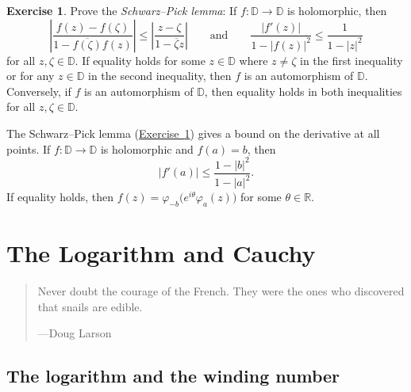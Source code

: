 \documentclass[12pt,openany]{book}
\newcommand{\widebar}[1]{\overline{#1}}
\newcommand{\sabs}[1]{\lvert {#1} \rvert}
\newcommand{\abs}[1]{\left\lvert {#1} \right\rvert}
\newcommand{\R}{{\mathbb{R}}}
\newcommand{\D}{{\mathbb{D}}}
\newcommand{\myindex}[1]{#1\index{#1}}
\theoremstyle{plain}
\theoremstyle{remark}
\theoremstyle{definition}
\newenvironment{exbox}{%
    \def\FrameCommand{\vrule width 1pt \relax\hspace{10pt}}%
    \MakeFramed{\advance\hsize-\width\FrameRestore}%
}{%
    \endMakeFramed
}
\newenvironment{myepigraph}{%
    \begin{quote}%
    \begingroup\itshape
}{%
    \endgroup%
    \end{quote}
}
\theoremstyle{exercise}
\newtheorem{exercise}{Exercise}[section]
\theoremstyle{example}
\newcommand{\exerciseref}[1]{\hyperref[#1]{Exercise~\ref*{#1}}}
\begin{document}
\begin{exbox}
\begin{exercise} \label{exercise:schwarzpick}
Prove the \emph{\myindex{Schwarz--Pick lemma}}:
If $f \colon \D \to \D$ is holomorphic, then
\begin{equation*}
\abs{
\frac{f(z)-f(\zeta)}{1-\overline{f(\zeta)}f(z)}
}
\leq
\abs{
\frac{z-\zeta}{1-\widebar{\zeta}z} 
}
\qquad
\text{and}
\qquad
\frac{\abs{f'(z)}}{1-\abs{f(z)}^2} \leq
\frac{1}{1-\abs{z}^2}
\end{equation*}
for all $z,\zeta \in \D$.
If equality holds 
for some $z \in \D$ where $z \neq \zeta$
in the first inequality
or for any $z \in \D$ in the second inequality,
then $f$ is an automorphism of $\D$.
Conversely, if $f$ is an automorphism of $\D$,
then equality holds in both inequalities for
all $z,\zeta \in \D$.
\end{exercise}
\end{exbox}

\pagebreak[0]
The Schwarz--Pick lemma (\exerciseref{exercise:schwarzpick}) gives a bound on the derivative
at all points.  If
$f \colon \D \to \D$ is holomorphic and $f(a) = b$,
then
\begin{equation*}
\sabs{f'(a)} \leq
\frac{1-\sabs{b}^2}{1-\sabs{a}^2} .
\end{equation*}
If equality holds, then $f(z) = \varphi_{-b}\bigl( e^{i\theta} \varphi_a(z)
\bigr)$ for some $\theta \in \R$.



\chapter{The Logarithm and Cauchy} \label{ch:log}

\begin{myepigraph}
Never doubt the courage of the French. They were the ones who discovered that snails are edible.

---Doug Larson
\end{myepigraph}


\section{The logarithm and the winding number}
\label{sec:log}
\end{document}

